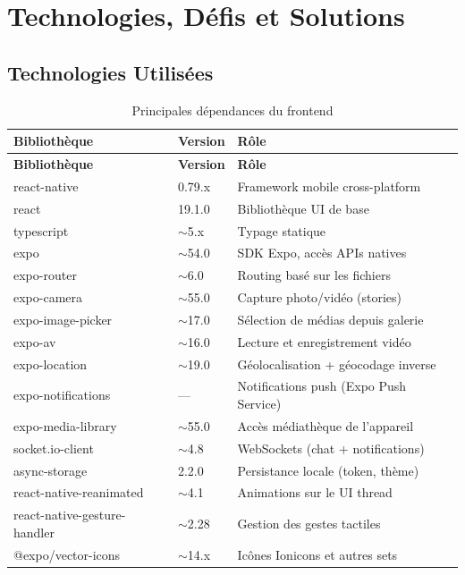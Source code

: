\chapter{Technologies, Défis et Solutions}

\section{Technologies Utilisées}

\begin{longtable}{@{}p{4.2cm}p{1.8cm}p{7.2cm}@{}}
  \caption{Principales dépendances du frontend}\label{tab:deps} \\
  \toprule
  \textbf{Bibliothèque} & \textbf{Version} & \textbf{Rôle} \\
  \midrule
  \endfirsthead
  \midrule
  \textbf{Bibliothèque} & \textbf{Version} & \textbf{Rôle} \\
  \midrule
  \endhead
  \bottomrule
  \endfoot
  react-native             & 0.79.x    & Framework mobile cross-platform \\
  react                    & 19.1.0    & Bibliothèque UI de base \\
  typescript               & $\sim$5.x & Typage statique \\
  expo                     & $\sim$54.0 & SDK Expo, accès APIs natives \\
  expo-router              & $\sim$6.0 & Routing basé sur les fichiers \\
  expo-camera              & $\sim$55.0 & Capture photo/vidéo (stories) \\
  expo-image-picker        & $\sim$17.0 & Sélection de médias depuis galerie \\
  expo-av                  & $\sim$16.0 & Lecture et enregistrement vidéo \\
  expo-location            & $\sim$19.0 & Géolocalisation + géocodage inverse \\
  expo-notifications       & —          & Notifications push (Expo Push Service) \\
  expo-media-library       & $\sim$55.0 & Accès médiathèque de l'appareil \\
  socket.io-client         & $\sim$4.8 & WebSockets (chat + notifications) \\
  async-storage            & 2.2.0     & Persistance locale (token, thème) \\
  react-native-reanimated  & $\sim$4.1 & Animations sur le UI thread \\
  react-native-gesture-handler & $\sim$2.28 & Gestion des gestes tactiles \\
  @expo/vector-icons       & $\sim$14.x & Icônes Ionicons et autres sets \\
\end{longtable}

